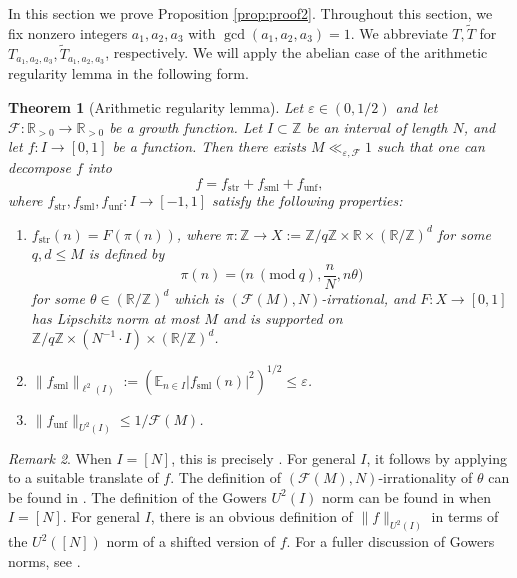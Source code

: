 \documentclass[12pt, notitlepage]{amsart}
\numberwithin{equation}{section}
\def\R{\mathbb R}
\def\Z{\mathbb Z}
\def\E{\mathbb E}
\def\CF{\mathcal F}
\def\wt{\widetilde}
\def\gcd{\operatorname{gcd}}
\newcommand{\eps}{\varepsilon}
\newcommand{\str}{\operatorname{str}}
\newcommand{\sml}{\operatorname{sml}}
\newcommand{\unf}{\operatorname{unf}}
\newcommand{\Mod}[1]{\ (\mathrm{mod}\ #1)}
\newtheorem{theorem}{Theorem}[section]
\theoremstyle{remark}
\newtheorem{remark}[theorem]{Remark}
\theoremstyle{definition}
\theoremstyle{remark}
\numberwithin{equation}{section}
\begin{document}
In this section we prove Proposition \ref{prop:proof2}. Throughout this section, we fix nonzero integers $a_1,a_2,a_3$ with $\gcd(a_1,a_2,a_3)=1$. We abbreviate $T,\wt{T}$ for $T_{a_1,a_2,a_3},\wt{T}_{a_1,a_2,a_3}$, respectively. We will apply the abelian case of the arithmetic regularity lemma in the following form. 

\begin{theorem}[Arithmetic regularity lemma]
Let $\eps \in (0,1/2)$ and let $\CF:\R_{>0}\rightarrow\R_{>0}$ be a growth function. Let $I \subset \Z$ be an interval of length $N$, and let $f: I\rightarrow [0,1]$ be a function. Then there exists $M \ll_{\eps,\CF}1$ such that one can decompose $f$ into
$$
f = f_{\str} + f_{\sml} + f_{\unf},
$$
where $f_{\str}, f_{\sml}, f_{\unf}: I \rightarrow [-1,1]$ satisfy the following properties:
\begin{enumerate}
\item $f_{\str}(n) = F(\pi(n))$, where $\pi: \Z\rightarrow X:= \Z/q\Z \times \R \times (\R/\Z)^d$ for some $q,d \leq M$ is defined by
$$
\pi(n) = \Big(n\Mod{q}, \frac{n}{N}, n\theta\Big)
$$
for some $\theta \in (\R/\Z)^d$ which is $(\CF(M), N)$-irrational, and $F: X\rightarrow [0,1]$ has Lipschitz norm at most $M$ and is supported on $\Z/q\Z \times (N^{-1}\cdot I) \times (\R/\Z)^d$.
\item $\|f_{\sml}\|_{\ell^2(I)} := (\E_{n \in I}|f_{\sml}(n)|^2)^{1/2}  \leq \eps$.
\item $\|f_{\unf}\|_{U^2(I)} \leq 1/\CF(M)$.
\end{enumerate}
\end{theorem}

\begin{remark}
When $I = [N]$, this is precisely \cite[Lemma A.2]{EberhardGreenManners}. For general $I$, it follows by applying \cite[Lemma A.2]{EberhardGreenManners} to a suitable translate of $f$. The definition of $(\CF(M),N)$-irrationality of $\theta$ can be found in \cite[Definition A.1]{EberhardGreenManners}. The definition of the Gowers $U^2(I)$ norm can be found in \cite[Definition A.7]{EberhardGreenManners} when $I = [N]$. For general $I$, there is an obvious definition of $\|f\|_{U^2(I)}$ in terms of the $U^2([N])$ norm of a shifted version of $f$. For a fuller discussion of Gowers norms, see \cite[Section 11.1]{TaoVu-book}.
\end{remark}
\end{document}
